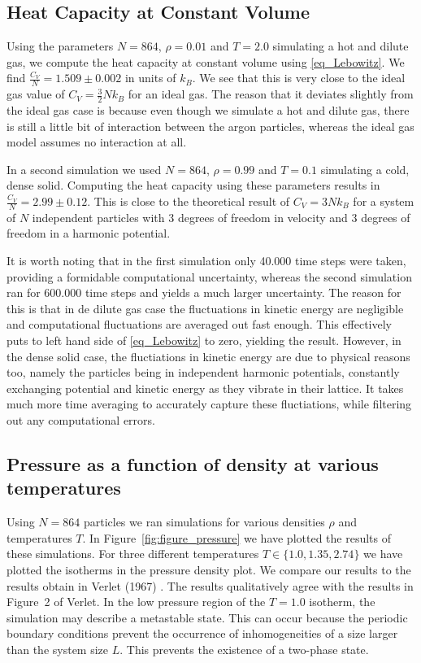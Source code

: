 \documentclass[twoside]{article}
\begin{document}
\subsection{Heat Capacity at Constant Volume}
Using the parameters $N=864$, $\rho=0.01$ and $T=2.0$ simulating a hot and dilute gas, we compute the heat capacity at constant volume using \eqref{eq_Lebowitz}. We find $\frac{C_V}{N} = 1.509  \pm 0.002 $ in units of $k_B$. We see that this is very close to the ideal gas value of $C_V = \frac{3}{2} N k_B$ for an ideal gas. The reason that it deviates slightly from the ideal gas case is because even though we simulate a hot and dilute gas, there is still a little bit of interaction between the argon particles, whereas the ideal gas model assumes no interaction at all.

In a second simulation we used $N=864$, $\rho=0.99$ and $T=0.1$ simulating a cold, dense solid. Computing the heat capacity using these parameters results in $\frac{C_V}{N} = 2.99  \pm  0.12 $. This is close to the theoretical result of $C_V = 3 N k_B$ for a system of $N$ independent particles with 3 degrees of freedom in velocity and 3 degrees of freedom in a harmonic potential. 

It is worth noting that in the first simulation only 40.000 time steps were taken, providing a formidable computational uncertainty, whereas the second simulation ran for 600.000 time steps and yields a much larger uncertainty. The reason for this is that in de dilute gas case the fluctuations in kinetic energy are negligible and computational fluctuations are averaged out fast enough. This effectively puts to left hand side of \eqref{eq_Lebowitz} to zero, yielding the result. However, in the dense solid case, the fluctiations in kinetic energy are due to physical reasons too, namely the particles being in independent harmonic potentials, constantly exchanging potential and kinetic energy as they vibrate in their lattice. It takes much more time averaging to accurately capture these fluctiations, while filtering out any computational errors. 

\subsection{Pressure as a function of density at various temperatures}
Using $N = 864$ particles we ran simulations for various densities $\rho$ and temperatures $T$. In Figure~\ref{fig:figure_pressure} we have plotted the results of these simulations. For three different temperatures $T \in \{1.0, 1.35, 2.74 \}$ we have plotted the isotherms in the pressure density plot. We compare our results to the results obtain in Verlet (1967) \cite{ref_verlet}. The results qualitatively agree with the results in Figure~2 of Verlet. In the low pressure region of the $T=1.0$ isotherm, the simulation may describe a metastable state. This can occur because the periodic boundary conditions prevent the occurrence of inhomogeneities of a size larger than the system size $L$. This prevents the existence of a two-phase state.
\end{document}

